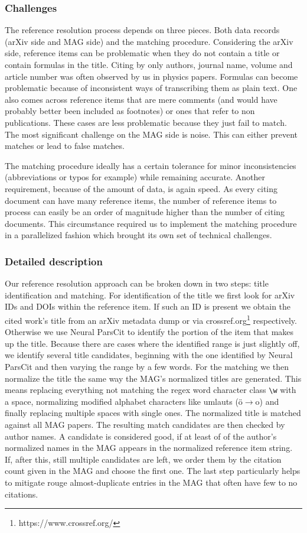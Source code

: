 \subsubsection{Challenges}
The reference resolution process depends on three pieces. Both data records (arXiv side and MAG side) and the matching procedure. Considering the arXiv side, reference items can be problematic when they do not contain a title or contain formulas in the title. Citing by only authors, journal name, volume and article number was often observed by us in physics papers. Formulas can become problematic because of inconsistent ways of transcribing them as plain text. One also comes across reference items that are mere comments (and would have probably better been included as footnotes) or ones that refer to non publications. These cases are less problematic because they just fail to match. The most significant challenge on the MAG side is noise. This can either prevent matches or lead to false matches.

The matching procedure ideally has a certain tolerance for minor inconsistencies (abbreviations or typos for example) while remaining accurate. Another requirement, because of the amount of data, is again speed. As every citing document can have many reference items, the number of reference items to process can easily be an order of magnitude higher than the number of citing documents. This circumstance required us to implement the matching procedure in a parallelized fashion which brought its own set of technical challenges.

\subsubsection{Detailed description}
Our reference resolution approach can be broken down in two steps: title identification and matching. For identification of the title we first look for arXiv IDs and DOIs within the reference item. If such an ID is present we obtain the cited work's title from an arXiv metadata dump or via crossref.org\footnote{https://www.crossref.org/} respectively. Otherwise we use Neural ParsCit\cite{Animesh2018} to identify the portion of the item that makes up the title. Because there are cases where the identified range is just slightly off, we identify several title candidates, beginning with the one identified by Neural ParsCit and then varying the range by a few words. For the matching we then normalize the title the same way the MAG's normalized titles are generated. This means replacing everything not matching the regex word character class \texttt{\textbackslash w} with a space, normalizing modified alphabet characters like umlauts (ö$\rightarrow$o) and finally replacing multiple spaces with single ones. The normalized title is matched against all MAG papers. The resulting match candidates are then checked by author names. A candidate is considered good, if at least of of the author's normalized names in the MAG appears in the normalized reference item string. If, after this, still multiple candidates are left, we order them by the citation count given in the MAG and choose the first one. The last step particularly helps to mitigate rouge almost-duplicate entries in the MAG that often have few to no citations.

